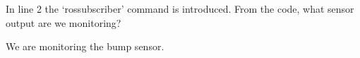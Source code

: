 In line 2 the ‘rossubscriber’ command is introduced. From the code, what sensor output are we monitoring?

\begin{solution}
    We are monitoring the bump sensor.
\end{solution}